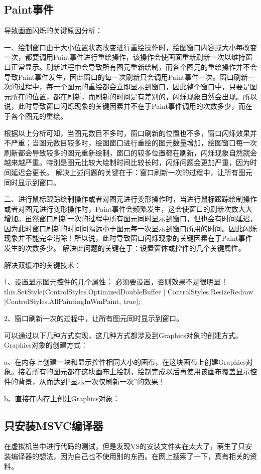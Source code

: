 \subsection{Paint事件}
导致画面闪烁的关键原因分析：

一、绘制窗口由于大小位置状态改变进行重绘操作时，绘图窗口内容或大小每改变一次，都要调用Paint事件进行重绘操作，该操作会使画面重新刷新一次以维持窗口正常显示。刷新过程中会导致所有图元重新绘制，而各个图元的重绘操作并不会导致Paint事件发生，因此窗口的每一次刷新只会调用Paint事件一次。窗口刷新一次的过程中，每一个图元的重绘都会立即显示到窗口，因此整个窗口中，只要是图元所在的位置，都在刷新，而刷新的时间是有差别的，闪烁现象自然会出现。所以说，此时导致窗口闪烁现象的关键因素并不在于Paint事件调用的次数多少，而在于各个图元的重绘。

根据以上分析可知，当图元数目不多时，窗口刷新的位置也不多，窗口闪烁效果并不严重；当图元数目较多时，绘图窗口进行重绘的图元数量增加，绘图窗口每一次刷新都会导致较多的图元重新绘制，窗口的较多位置都在刷新，闪烁现象自然就会越来越严重。特别是图元比较大绘制时间比较长时，闪烁问题会更加严重，因为时间延迟会更长。
解决上述问题的关键在于：窗口刷新一次的过程中，让所有图元同时显示到窗口。

二、进行鼠标跟踪绘制操作或者对图元进行变形操作时，当进行鼠标跟踪绘制操作或者对图元进行变形操作时，Paint事件会频繁发生，这会使窗口的刷新次数大大增加。虽然窗口刷新一次的过程中所有图元同时显示到窗口，但也会有时间延迟，因为此时窗口刷新的时间间隔远小于图元每一次显示到窗口所用的时间。因此闪烁现象并不能完全消除！所以说，此时导致窗口闪烁现象的关键因素在于Paint事件发生的次数多少。
解决此问题的关键在于：设置窗体或控件的几个关键属性。

解决双缓冲的关键技术：

1、设置显示图元控件的几个属性： 必须要设置，否则效果不是很明显！
this.SetStyle(ControlStyles.OptimizedDoubleBuffer | ControlStyles.ResizeRedraw |ControlStyles.AllPaintingInWmPaint, true);

2、窗口刷新一次的过程中，让所有图元同时显示到窗口。

可以通过以下几种方式实现，这几种方式都涉及到Graphics对象的创建方式。
Graphics对象的创建方式：

a、在内存上创建一块和显示控件相同大小的画布，在这块画布上创建Graphics对象。接着所有的图元都在这块画布上绘制，绘制完成以后再使用该画布覆盖显示控件的背景，从而达到“显示一次仅刷新一次”的效果！

b、直接在内存上创建Graphics对象：
\subsection{只安装MSVC编译器}
在虚拟机当中进行代码的测试，但是发现VS的安装文件实在太大了，萌生了只安装编译器的想法，因为自己也不使用别的东西。在网上搜索了一下，真有相关的资料。

